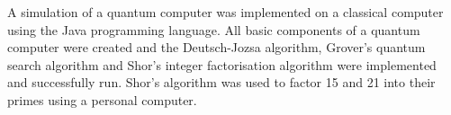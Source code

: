A simulation of a quantum computer was implemented on a classical computer using the Java programming language. All basic components of a quantum computer were created and the Deutsch-Jozsa algorithm, Grover's quantum search algorithm and Shor's integer factorisation algorithm were implemented and successfully run. Shor's algorithm was used to factor 15 and 21 into their primes using a personal computer.